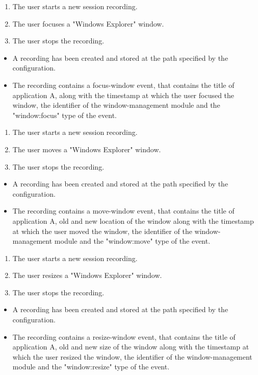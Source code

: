 \begin{tests}
	{\begin{enumerate}
		\item The user starts a new session recording.
		\item The user focuses a "Windows Explorer" window.
		\item The user stops the recording.
	\end{enumerate}}
	{\begin{itemize}
		\item A recording has been created and stored at the path specified by the configuration.
		\item The recording contains a focus-window event, that contains the title of application A, along with the timestamp at which the user focused the window, the identifier of the window-management module and the "window:focus" type of the event.
	\end{itemize}}
	
	{\begin{enumerate}
		\item The user starts a new session recording.
		\item The user moves a "Windows Explorer" window.
		\item The user stops the recording.
	\end{enumerate}}
	{\begin{itemize}
		\item A recording has been created and stored at the path specified by the configuration.
		\item The recording contains a move-window event, that contains the title of application A, old and new location of the window along with the timestamp at which the user moved the window, the identifier of the window-management module and the "window:move" type of the event.
	\end{itemize}}
	
	{\begin{enumerate}
		\item The user starts a new session recording.
		\item The user resizes a "Windows Explorer" window.
		\item The user stops the recording.
	\end{enumerate}}
	{\begin{itemize}
		\item A recording has been created and stored at the path specified by the configuration.
		\item The recording contains a resize-window event, that contains the title of application A, old and new size of the window along with the timestamp at which the user resized the window, the identifier of the window-management module and the "window:resize" type of the event.
	\end{itemize}}
	

\end{tests}

